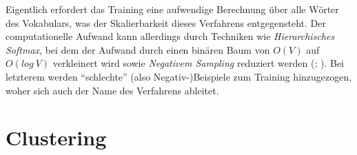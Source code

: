 Eigentlich erfordert das Training eine aufwendige Berechnung über alle Wörter des Vokabulars, was der Skalierbarkeit dieses
Verfahrens entgegensteht. Der computationelle Aufwand kann allerdings durch Techniken wie \emph{Hierarchisches Softmax}, bei dem
der Aufwand durch einen binären Baum von $O(V)$ auf $O(log\ V)$ verkleinert wird sowie
\emph{Negativem Sampling} reduziert werden (\cite{rong2014word2vec}; \cite{goldberg2014word2vec}).
Bei letzterem werden ``schlechte'' (also Negativ-)Beispiele zum Training hinzugezogen, woher sich auch der Name des Verfahrens ableitet.\\

%


\section{Clustering}

